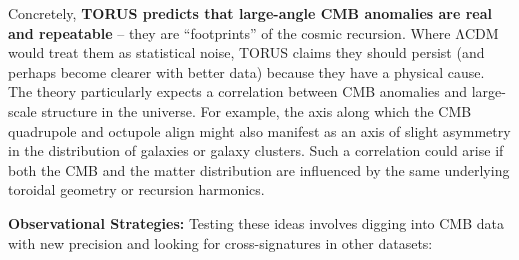 \documentclass[
]{article}
\begin{document}
Concretely, \textbf{TORUS predicts that large-angle CMB anomalies are
real and repeatable} -- they are ``footprints'' of the cosmic recursion.
Where ΛCDM would treat them as statistical noise, TORUS claims they
should persist (and perhaps become clearer with better data) because
they have a physical cause\hspace{0pt}. The theory particularly expects
a correlation between CMB anomalies and large-scale structure in the
universe\hspace{0pt}. For example, the axis along which the CMB
quadrupole and octupole align might also manifest as an axis of slight
asymmetry in the distribution of galaxies or galaxy clusters. Such a
correlation could arise if both the CMB and the matter distribution are
influenced by the same underlying toroidal geometry or recursion
harmonics.

\textbf{Observational Strategies:} Testing these ideas involves digging
into CMB data with new precision and looking for cross-signatures in
other datasets:
\end{document}
